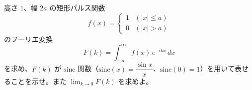 
高さ $1$、幅 $2a$ の矩形パルス関数
\[
f(x) =
\begin{cases}
1 & (|x| \le a) \\
0 & (|x| > a)
\end{cases}
\]
のフーリエ変換
\[
F(k) = \int_{-\infty}^{\infty} f(x)\,e^{-ikx}\,dx
\]
を求め、$F(k)$ が $\mathrm{sinc}$ 関数（$\mathrm{sinc}(x) = \dfrac{\sin x}{x}$、$\mathrm{sinc}(0)=1$）を用いて表せることを示せ。また $\displaystyle\lim_{k \to 0} F(k)$ を求めよ。
